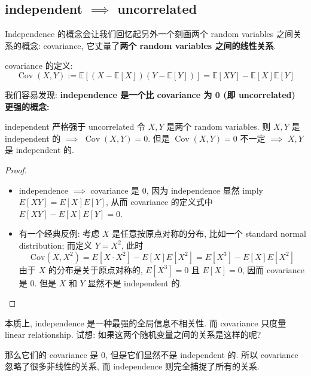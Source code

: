 \subsection{independent $\implies$ uncorrelated}
Independence 的概念会让我们回忆起另外一个刻画两个 random variables 
之间关系的概念: covariance, 它丈量了\textbf{两个 random variables 之间的线性关系}.

 covariance 的定义:
$$
\operatorname{Cov}(X, Y):=\mathbb{E}[(X-\mathbb{E}[X])(Y-\mathbb{E}[Y])] = \mathbb{E}[XY]-\mathbb{E}[X] \mathbb{E}[Y]
$$

我们容易发现: \textbf{independence 是一个比 covariance 为 0 (即 uncorrelated) 更强的概念:}
\begin{proposition}{independent 严格强于 uncorrelated}
    令 \(X, Y\) 是两个 random variables. 
    则 \(X, Y\) 是 independent 的 \(\implies\) \(\operatorname{Cov}(X, Y) = 0\).
    但是 \(\operatorname{Cov}(X, Y) = 0\) 不一定 \(\implies\) \(X, Y\) 是 independent 的.
\end{proposition}
\begin{proof}
\begin{itemize}
    \item independence \(\implies\) covariance 是 0, 因为 independence 显然 imply\(E[XY] = E[X]E[Y]\), 
    从而 covariance 的定义式中 \(E[XY] - E[X]E[Y] = 0\).
    \item  有一个经典反例: 考虑 \(X\) 是任意按原点对称的分布, 比如一个 standard normal distribution; 而定义 \(Y = X^2\),
此时 $$\text{Cov}(X, X^2) = E[X \cdot X^2] - E[X]E[X^2] = E[X^3] - E[X]E[X^2]$$
由于 \(X\) 的分布是关于原点对称的, \(E[X^3] = 0\) 且 \(E[X] = 0\), 因而 covariance 是 0.
但是 \(X\) 和 \(Y\) 显然不是 independent 的.
\end{itemize}
\end{proof}
\begin{remark}
本质上, independence 是一种最强的全局信息不相关性. 
而 covariance 只度量 linear relationship.  
试想: 如果这两个随机变量之间的关系是这样的呢?
\begin{center}
\end{center}
那么它们的 covariance 是 0, 但是它们显然不是 independent 的. 所以 covariance 
忽略了很多非线性的关系, 而 independence 则完全捕捉了所有的关系. \\
\end{remark}

